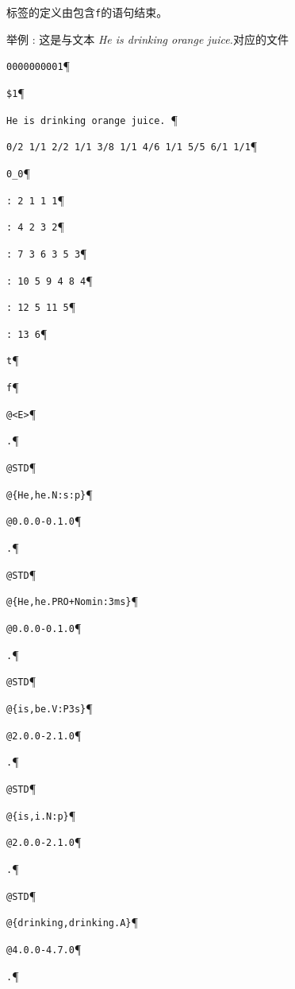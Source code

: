 \bigskip
\noindent 
标签的定义由包含\verb+f+的语句结束。

\bigskip
\noindent 举例 : 这是与文本 \textit{He is
drinking orange juice.}对应的文件

\bigskip
\noindent\verb$0000000001$\P

\noindent\verb+$1+\P

\noindent\verb$He is drinking orange juice. $\P

\noindent\verb$0/2 1/1 2/2 1/1 3/8 1/1 4/6 1/1 5/5 6/1 1/1$\P

\noindent\verb$0_0$\P

\noindent\verb$: 2 1 1 1$\P

\noindent\verb$: 4 2 3 2$\P

\noindent\verb$: 7 3 6 3 5 3$\P

\noindent\verb$: 10 5 9 4 8 4$\P

\noindent\verb$: 12 5 11 5$\P

\noindent\verb$: 13 6$\P

\noindent\verb$t$\P

\noindent\verb$f$\P

\noindent\verb$@<E>$\P

\noindent\verb$.$\P

\noindent\verb$@STD$\P

\noindent\verb$@{He,he.N:s:p}$\P

\noindent\verb$@0.0.0-0.1.0$\P

\noindent\verb$.$\P

\noindent\verb$@STD$\P

\noindent\verb$@{He,he.PRO+Nomin:3ms}$\P

\noindent\verb$@0.0.0-0.1.0$\P

\noindent\verb$.$\P

\noindent\verb$@STD$\P

\noindent\verb$@{is,be.V:P3s}$\P

\noindent\verb$@2.0.0-2.1.0$\P

\noindent\verb$.$\P

\noindent\verb$@STD$\P

\noindent\verb$@{is,i.N:p}$\P

\noindent\verb$@2.0.0-2.1.0$\P

\noindent\verb$.$\P

\noindent\verb$@STD$\P

\noindent\verb$@{drinking,drinking.A}$\P

\noindent\verb$@4.0.0-4.7.0$\P

\noindent\verb$.$\P


